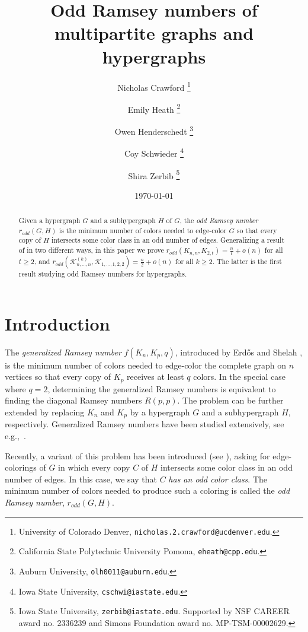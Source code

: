 \documentclass{article}
\title{Odd Ramsey numbers of  multipartite graphs and hypergraphs}
\author{Nicholas Crawford \footnote{University of Colorado Denver, \texttt{nicholas.2.crawford@ucdenver.edu}.}
\and
Emily Heath \footnote {California State Polytechnic University Pomona, \texttt{eheath@cpp.edu}.}
\and Owen Henderschedt \footnote {Auburn University, \texttt{olh0011@auburn.edu}.}
\and Coy Schwieder \footnote {Iowa State University, \texttt{cschwi@iastate.edu}.}
\and Shira Zerbib \footnote {Iowa State University, \texttt{zerbib@iastate.edu}. Supported by NSF CAREER award no. 2336239  and Simons Foundation award no. MP-TSM-00002629.}}
\date{\today}
\theoremstyle{definition}
\newcommand\cK{{\mathcal K}}
\newcommand{\oram}{r_{odd}}
\begin{document}
\maketitle

\begin{abstract}
Given a hypergraph $G$ and a subhypergraph $H$ of $G$, the \emph{odd Ramsey number} $\oram(G,H)$ is the minimum number of colors needed to edge-color $G$ so that every copy of $H$ intersects some color class in an odd number of edges.
Generalizing a result of \cite{BHZ} in two different ways, in this paper we prove $\oram \left(K_{n,n}, K_{2,t} \right)=\frac{n}{t} + o(n)$ for all $t\geq 2$,  and $\oram \left(\cK^{(k)}_{n,\dots,n}, \cK_{1,\dots,1,2,2} \right) = \frac{n}{2} + o(n)$ for all $k\geq 2$.  The latter is the first result studying odd Ramsey numbers for hypergraphs. 
\end{abstract}



\section{Introduction}


The {\em generalized Ramsey number} $f(K_n,K_p,q)$, introduced by Erd\H{o}s and Shelah  \cite{Erdos-Shelah1}, is the minimum number of colors needed to edge-color the complete graph on $n$ vertices so that every copy of $K_p$ receives at least $q$ colors.   
In the special case where $q=2$, determining the generalized Ramsey numbers is equivalent to finding the diagonal Ramsey numbers $R(p,p)$. The problem can be further extended by replacing $K_n$ and $K_p$ by a hypergraph  $G$ and a subhypergraph $H$, respectively. Generalized Ramsey numbers have been studied extensively, see e.g.,~\cite{AFM,BEHK,BCDP,BED,CH1,CH2,CFLS,er-gy, Mubayi1,mubayi2004}. 

Recently, a variant of this problem has been introduced (see \cite{alon-codes,BDLP,BHZ,Versteegen}), asking for edge-colorings of $G$ in which every copy $C$ of $H$ intersects some color class in an odd number of edges. In this case, we say that $C$ {\em has an odd color class}. The minimum number of colors needed to produce such a coloring is called the \emph{odd Ramsey number}, $\oram(G,H)$. 
\end{document}
